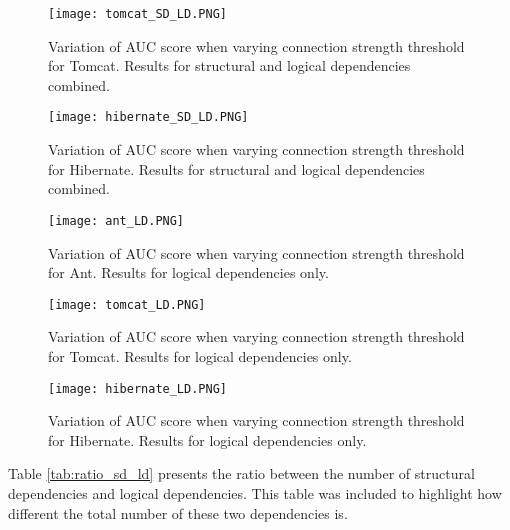 \begin{figure}
\centering
\texttt{[image: tomcat\_SD\_LD.PNG]}
\caption{Variation of AUC score when varying connection strength threshold for Tomcat. Results for structural and logical dependencies combined. }
\label{fig:plot_sd_ld_tomcat}
\centering
\end{figure}


\begin{figure}
\centering
\texttt{[image: hibernate\_SD\_LD.PNG]}
\caption{Variation of AUC score when varying connection strength threshold for Hibernate. Results for structural and logical dependencies combined. }
\label{fig:plot_sd_ld_hibernate}
\centering
\end{figure}



\begin{figure}
\centering
\texttt{[image: ant\_LD.PNG]}
\caption{Variation of AUC score when varying connection strength threshold for Ant. Results for logical dependencies only. }
\label{fig:plot_ld_ant}
\centering
\end{figure}


\begin{figure}
\centering
\texttt{[image: tomcat\_LD.PNG]}
\caption{Variation of AUC score when varying connection strength threshold for Tomcat. Results for logical dependencies only. }
\label{fig:plot_ld_tomcat}
\centering
\end{figure}


\begin{figure}
\centering
\texttt{[image: hibernate\_LD.PNG]}
\caption{Variation of AUC score when varying connection strength threshold for Hibernate. Results for logical dependencies only.}
\label{fig:plot_ld_hibernate}
\centering
\end{figure}



Table \ref{tab:ratio_sd_ld} presents the ratio between the number of structural dependencies and logical dependencies. This table was included to highlight how different the total number of these two dependencies is.


